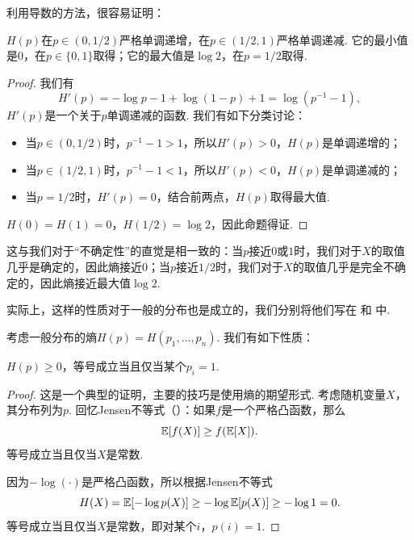 利用导数的方法，很容易证明：
\begin{proposition}\label{proposition:entropy-2prob}
    $H(p)$在$p\in (0,1/2)$严格单调递增，在$p\in (1/2,1)$严格单调递减. 它的最小值是$0$，在$p\in\{0,1\}$取得；它的最大值是$\log 2$，在$p=1/2$取得.    
\end{proposition}
\begin{proof}
    我们有
    \[H'(p)=-\log p-1+\log(1-p)+1=\log(p^{-1}-1),\]
    $H'(p)$是一个关于$p$单调递减的函数. 我们有如下分类讨论：
    \begin{itemize}
        \item 当$p\in (0,1/2)$时，$p^{-1}-1>1$，所以$H'(p)>0$，$H(p)$是单调递增的；
        \item 当$p\in (1/2,1)$时，$p^{-1}-1<1$，所以$H'(p)<0$，$H(p)$是单调递减的；
        \item 当$p=1/2$时，$H'(p)=0$，结合前两点，$H(p)$取得最大值. 
    \end{itemize}
    $H(0)=H(1)=0$，$H(1/2)=\log 2$，因此命题得证.
\end{proof}
这与我们对于“不确定性”的直觉是相一致的：当$p$接近$0$或$1$时，我们对于$X$的取值几乎是确定的，因此熵接近$0$；当$p$接近$1/2$时，我们对于$X$的取值几乎是完全不确定的，因此熵接近最大值$\log 2$. 
 
实际上，这样的性质对于一般的分布也是成立的，我们分别将他们写在 和 中.

考虑一般分布的熵$H(p)=H(p_1,\dots,p_n)$. 我们有如下性质：
\begin{proposition}\label{proposition:entropy-nonnegative}
    $H(p)\geq 0$，等号成立当且仅当某个$p_i=1$.
\end{proposition}
\begin{proof}
这是一个典型的证明，主要的技巧是使用熵的期望形式. 考虑随机变量$X$，其分布列为$p$. 回忆Jensen不等式（）：如果$f$是一个严格凸函数，那么
\[\mathbb{E}[f(X)]\geq f(\mathbb{E}[X]).\]
等号成立当且仅当$X$是常数.

因为$-\log(\cdot)$是严格凸函数，所以根据Jensen不等式
\[H(X)=\mathbb{E}[-\log p(X)]\geq-\log\mathbb{E}[p(X)]\geq -\log 1=0.\]
等号成立当且仅当$X$是常数，即对某个$i$，$p(i)=1$.
\end{proof}

